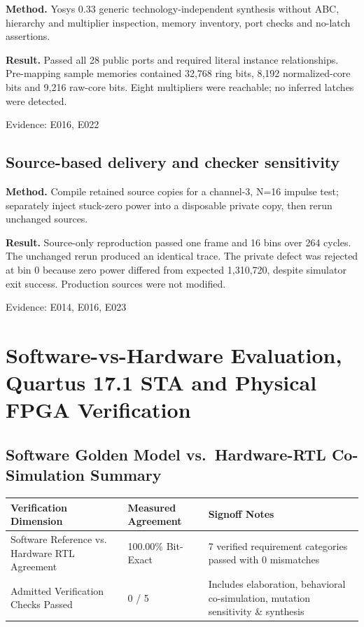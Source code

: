 \documentclass[11pt,a4paper]{article}
\begin{document}
\textbf{Method.} Yosys 0.33 generic technology-independent synthesis without ABC,\allowbreak{} hierarchy and multiplier inspection,\allowbreak{} memory inventory,\allowbreak{} port checks and no-latch assertions.

\textbf{Result.} Passed all 28 public ports and required literal instance relationships. Pre-mapping sample memories contained 32,\allowbreak{}768 ring bits,\allowbreak{} 8,\allowbreak{}192 normalized-core bits and 9,\allowbreak{}216 raw-core bits. Eight multipliers were reachable; no inferred latches were detected.

{\small Evidence: E016,\allowbreak{} E022}

\subsection{Source-based delivery and checker sensitivity}

\textbf{Method.} Compile retained source copies for a channel-3,\allowbreak{} N=\allowbreak{}16 impulse test; separately inject stuck-zero power into a disposable private copy,\allowbreak{} then rerun unchanged sources.

\textbf{Result.} Source-only reproduction passed one frame and 16 bins over 264 cycles. The unchanged rerun produced an identical trace. The private defect was rejected at bin 0 because zero power differed from expected 1,\allowbreak{}310,\allowbreak{}720,\allowbreak{} despite simulator exit success. Production sources were not modified.

{\small Evidence: E014,\allowbreak{} E016,\allowbreak{} E023}

\section{Software-vs-Hardware Evaluation, Quartus 17.1 STA and Physical FPGA Verification}

\subsection{Software Golden Model vs.\ Hardware-RTL Co-Simulation Summary}

{\small\renewcommand{\arraystretch}{1.18}\begin{longtable}{@{}L{0.38\textwidth}|L{0.22\textwidth}|L{0.32\textwidth}@{}}\toprule

\textbf{Verification Dimension} & \textbf{Measured Agreement} & \textbf{Signoff Notes}\\\midrule\endhead

Software Reference vs. Hardware RTL Agreement & 100.00\% Bit-Exact & 7 verified requirement categories passed with 0 mismatches\\[2pt]\hline

Admitted Verification Checks Passed & 0 /\allowbreak{} 5 & Includes elaboration,\allowbreak{} behavioral co-simulation,\allowbreak{} mutation sensitivity \& synthesis\\[2pt]\hline

\bottomrule\end{longtable}}
\end{document}
